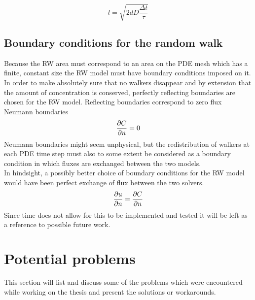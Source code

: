 \begin{equation}\label{theory:step_length}
 l = \sqrt{2dD\frac{\Delta t}{\tau}}
\end{equation}

\subsection{Boundary conditions for the random walk}\label{theory:BC_RW}

Because the RW area must correspond to an area on the PDE mesh which has a finite, constant size the RW model must have boundary conditions imposed on it. 
In order to make absolutely sure that no walkers disappear and by extension that the amount of concentration is conserved, perfectly reflecting boundaries are chosen for the RW model. 
Reflecting boundaries correspond to zero flux Neumann boundaries
\begin{equation}
 \frac{\partial C}{\partial n} = 0
\end{equation}
Neumann boundaries might seem unphysical, but the redistribution of walkers at each PDE time step must also to some extent be considered as a boundary condition in which fluxes are exchanged between the two models. \\
In hindsight, a possibly better choice of boundary conditions for the RW model would have been perfect exchange of flux between the two solvers. 
\begin{equation}
 \frac{\partial u}{\partial n} = \frac{\partial C}{\partial n}
\end{equation}
Since time does not allow for this to be implemented and tested it will be left as a reference to possible future work.

\section{Potential problems}\label{problems_and_pitfalls}
 
 This section will list and discuss some of the problems which were encountered while working on the thesis and present the solutions or workarounds.

% 


